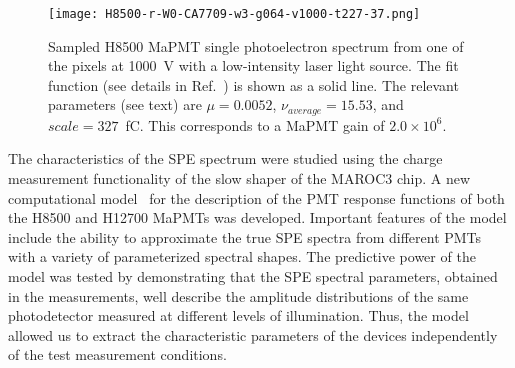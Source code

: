 \documentclass[5p,times,twocolumn]{elsarticle}
\def\MaPMT{MaPMT }
\begin{document}
\begin{figure}[bth]
	\centering
	\texttt{[image: H8500-r-W0-CA7709-w3-g064-v1000-t227-37.png]}
	\caption{Sampled H8500 \MaPMT single photoelectron spectrum from one of the pixels at 1000~V with a low-intensity
          laser light source. The fit function (see details in Ref.~\cite{Pavel}) is shown as a solid line. 
          The relevant parameters (see text) are $\mu=0.0052$, $\nu_{average}=15.53$, and $scale=327$~fC. This corresponds
          to a \MaPMT gain of $2.0 \times 10^6$.
          }
	\label{fig:SPEH8500}
\end{figure}

The characteristics of the SPE spectrum were studied using the charge measurement functionality of the slow shaper
of the MAROC3 chip. A new computational model~\cite{Pavel} for the description of the PMT response
functions of both the H8500 and H12700 MaPMTs was developed. Important features of the model include the ability
to approximate the true SPE spectra from different PMTs with a variety of
parameterized spectral shapes.
The predictive power of the model was tested by demonstrating that the SPE spectral parameters, obtained in the
measurements, well describe the amplitude distributions of the same photodetector measured at different levels
of illumination. Thus, the model allowed us to extract the characteristic parameters of the devices independently of the test measurement conditions.
\end{document}
